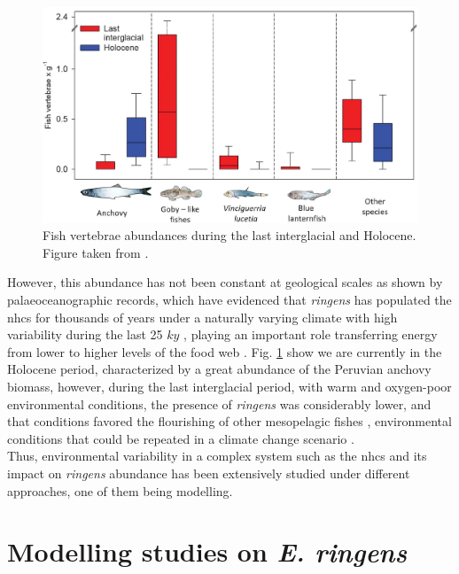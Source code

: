 \begin{figure}[!]
	\includegraphics[width=1.0\textwidth]{figures/Chap1VertebraeAbundances.png}
	\centering
	\caption{Fish vertebrae abundances during the last interglacial and Holocene. Figure taken from \cite{SalvSchn2022}.}
	\label{Chap1VertebraeAbundances}
\end{figure}

However, this abundance has not been constant at geological scales as shown by palaeoceanographic records, which have evidenced that \textit{\gls{ringens}} has populated the \acrshort{nhcs} for thousands of years under a naturally varying climate with high variability during the last 25 $ky$ \citep{SalvField2018,SalvGuti2019,SalvSchn2022}, playing an important role transferring energy from lower to higher levels of the food web \citep{ChecAsch2017}. Fig. \ref{Chap1VertebraeAbundances} show we are currently in the Holocene period, characterized by a great abundance of the Peruvian anchovy biomass, however, during the last interglacial period, with warm and oxygen-poor environmental conditions, the presence of \textit{\gls{ringens}} was considerably lower, and that conditions favored the flourishing of other mesopelagic fishes \citep{SalvSchn2022}, environmental conditions that could be repeated in a climate change scenario \citep{EcheGeva2020}.\\

Thus, environmental variability in a complex system such as the \acrshort{nhcs} and its impact on \textit{\gls{ringens}} abundance has been extensively studied under different approaches, one of them being modelling.\\

\clearpage
\section{Modelling studies on \textit{E. ringens}}\label{Chap1ModeAnch}

